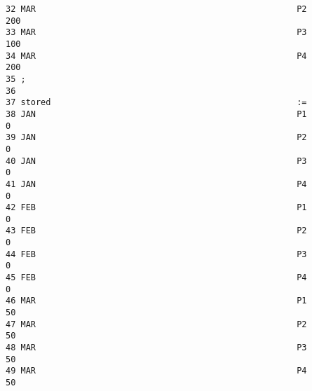 \documentclass[12pt]{article}
\begin{document}
\begin{verbatim}
32 MAR                                                    P2                                 200                                                     
33 MAR                                                    P3                                 100                                                     
34 MAR                                                    P4                                 200                                                     
35 ;                                                                                                                           
36                                                                                                                             
37 stored                                                 :=                                                    
38 JAN                                                    P1                                 0                                                     
39 JAN                                                    P2                                 0                                                     
40 JAN                                                    P3                                 0                                                     
41 JAN                                                    P4                                 0                                                     
42 FEB                                                    P1                                 0                                                     
43 FEB                                                    P2                                 0                                                     
44 FEB                                                    P3                                 0                                                     
45 FEB                                                    P4                                 0                                                     
46 MAR                                                    P1                                 50                                                     
47 MAR                                                    P2                                 50                                                     
48 MAR                                                    P3                                 50                                                     
49 MAR                                                    P4                                 50                                                     
\end{verbatim}
\end{document}
